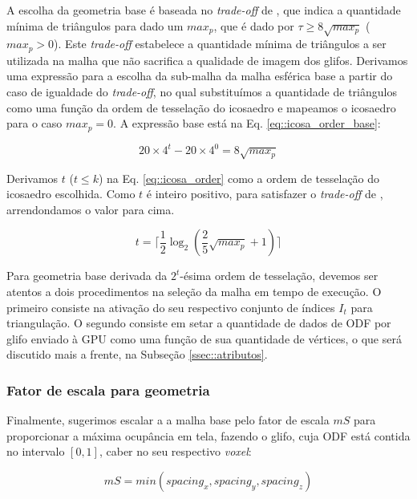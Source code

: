 A escolha da geometria base é baseada no \textit{trade-off} de , que indica a quantidade mínima de triângulos para dado um $max_p$, que é dado por $\tau \geq 8\sqrt{max_p}$  ($max_p > 0$). Este \textit{trade-off} estabelece a quantidade mínima de triângulos a ser utilizada na malha que não sacrifica a qualidade de imagem dos glifos. Derivamos uma expressão para a escolha da sub-malha da malha esférica base a partir do caso de igualdade do \textit{trade-off}, no qual substituímos a quantidade de triângulos como uma função da ordem de tesselação do icosaedro e mapeamos o icosaedro para o caso $max_p = 0$. A expressão base está na Eq. \ref{eq::icosa_order_base}:

\begin{equation}
\label{eq::icosa_order_base}
     20\times 4^t - 20\times 4^0 = 8\sqrt{max_p}
\end{equation}

Derivamos $t$ ($t \leq k$) na Eq. \ref{eq::icosa_order} como a ordem de tesselação do icosaedro escolhida. Como $t$ é inteiro positivo, para satisfazer o \textit{trade-off} de , arrendondamos o valor para cima.

\begin{equation}
\label{eq::icosa_order}
     t = \lceil \frac{1}{2}\log_2{(\frac{2}{5}\sqrt{max_p} + 1)} \rceil
\end{equation}

Para geometria base derivada da $2^t$-ésima ordem de tesselação, devemos ser atentos a dois procedimentos na seleção da malha em tempo de execução. O primeiro consiste na ativação do seu respectivo conjunto de índices $I_t$ para triangulação. O segundo consiste em setar a quantidade de dados de ODF por glifo enviado à GPU como uma função de sua quantidade de vértices, o que será discutido mais a frente, na Subseção \ref{ssec::atributos}.

\subsubsection{Fator de escala para geometria}

Finalmente, sugerimos escalar a a malha base pelo fator de escala $mS$ para proporcionar a máxima ocupância em tela, fazendo o glifo, cuja ODF está contida no intervalo $[0, 1]$, caber no seu respectivo \textit{voxel}:

\begin{equation}
\label{eq:spacings}
mS = min(spacing_x, spacing_y, spacing_z)
\end{equation}


